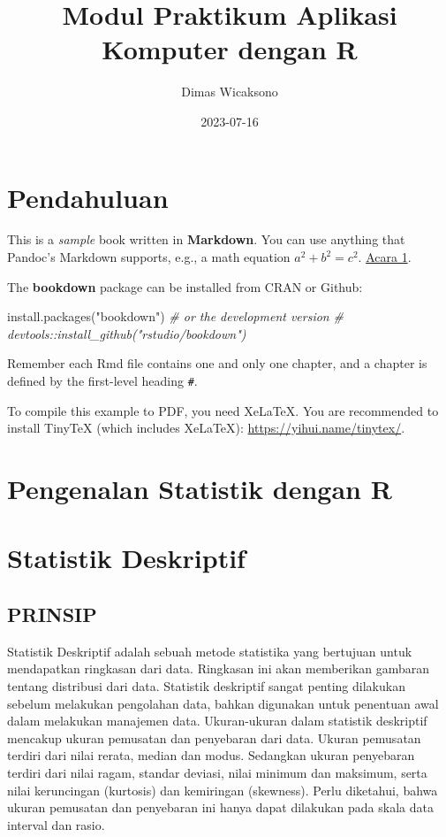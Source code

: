 \documentclass[
]{book}
\title{Modul Praktikum Aplikasi Komputer dengan R}
\author{Dimas Wicaksono}
\date{2023-07-16}
\newenvironment{Shaded}{\begin{snugshade}}{\end{snugshade}}
\newcommand{\CommentTok}[1]{\textcolor[rgb]{0.56,0.35,0.01}{\textit{#1}}}
\newcommand{\FunctionTok}[1]{\textcolor[rgb]{0.00,0.00,0.00}{#1}}
\newcommand{\NormalTok}[1]{#1}
\newcommand{\StringTok}[1]{\textcolor[rgb]{0.31,0.60,0.02}{#1}}
\begin{document}
\maketitle

{
\setcounter{tocdepth}{1}
\tableofcontents
}
\hypertarget{pendahuluan}{%
\chapter*{Pendahuluan}\label{pendahuluan}}

This is a \emph{sample} book written in \textbf{Markdown}. You can use anything that Pandoc's Markdown supports, e.g., a math equation \(a^2 + b^2 = c^2\). \protect\hyperlink{a1-pengenalan}{Acara 1}.

The \textbf{bookdown} package can be installed from CRAN or Github:

\begin{Shaded}
\begin{Highlighting}[]
\FunctionTok{install.packages}\NormalTok{(}\StringTok{"bookdown"}\NormalTok{)}
\CommentTok{\# or the development version}
\CommentTok{\# devtools::install\_github("rstudio/bookdown")}
\end{Highlighting}
\end{Shaded}

Remember each Rmd file contains one and only one chapter, and a chapter is defined by the first-level heading \texttt{\#}.

To compile this example to PDF, you need XeLaTeX. You are recommended to install TinyTeX (which includes XeLaTeX): \url{https://yihui.name/tinytex/}.

\hypertarget{a1-pengenalan}{%
\chapter{Pengenalan Statistik dengan R}\label{a1-pengenalan}}

\hypertarget{a2-deskriptif}{%
\chapter{Statistik Deskriptif}\label{a2-deskriptif}}

\hypertarget{prinsip}{%
\section{PRINSIP}\label{prinsip}}

Statistik Deskriptif adalah sebuah metode statistika yang bertujuan untuk mendapatkan ringkasan dari data. Ringkasan ini akan memberikan gambaran tentang distribusi dari data. Statistik deskriptif sangat penting dilakukan sebelum melakukan pengolahan data, bahkan digunakan untuk penentuan awal dalam melakukan manajemen data. Ukuran-ukuran dalam statistik deskriptif mencakup ukuran pemusatan dan penyebaran dari data. Ukuran pemusatan terdiri dari nilai rerata, median dan modus. Sedangkan ukuran penyebaran terdiri dari nilai ragam, standar deviasi, nilai minimum dan maksimum, serta nilai keruncingan (kurtosis) dan kemiringan (skewness). Perlu diketahui, bahwa ukuran pemusatan dan penyebaran ini hanya dapat dilakukan pada skala data interval dan rasio.
\end{document}
